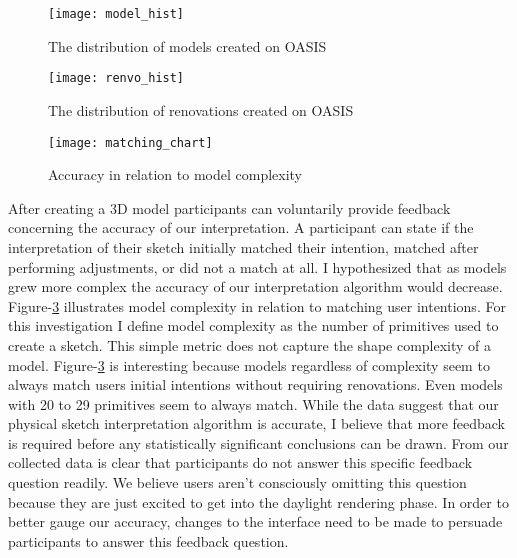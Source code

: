\begin{figure}[!ht]
	\centering
	\texttt{[image: model\_hist]}
	\caption{The distribution of models created on OASIS}
	\label{fig:model_hist}
\end{figure}


\begin{figure}[!ht]
	\centering
	\texttt{[image: renvo\_hist]}
	\caption{The distribution of renovations created on OASIS}
	\label{fig:renvo_hist}
\end{figure}


\begin{figure}[!ht]
	\centering
	\texttt{[image: matching\_chart]}
	\caption{Accuracy in relation to model complexity}
	\label{fig:matching_chart}
\end{figure}

After creating a 3D model participants can voluntarily provide feedback concerning the accuracy of our interpretation.
A participant can state if the  interpretation of their sketch initially matched their intention,  matched after performing adjustments, or did not a match at all.
I hypothesized that as models grew more complex the accuracy of our interpretation algorithm would decrease.
Figure-\ref{fig:matching_chart} illustrates model complexity in relation to matching user intentions.
For this investigation I define model complexity as the number of primitives used to create a sketch. This simple metric does not capture the shape complexity of a model.
Figure-\ref{fig:matching_chart} is interesting because models regardless of complexity seem to always match users initial intentions without requiring renovations.
Even models with 20 to 29 primitives seem to always match.
While the data suggest that our physical sketch interpretation algorithm is accurate, I believe that more feedback is required before any statistically significant conclusions can be drawn.
From our collected data is clear that participants do not answer this specific feedback question readily.
We believe users aren't consciously omitting this question because they are just excited to get into the daylight rendering phase.
In order to better gauge our accuracy, changes to the interface need to be made to persuade participants to answer this feedback question. \\




